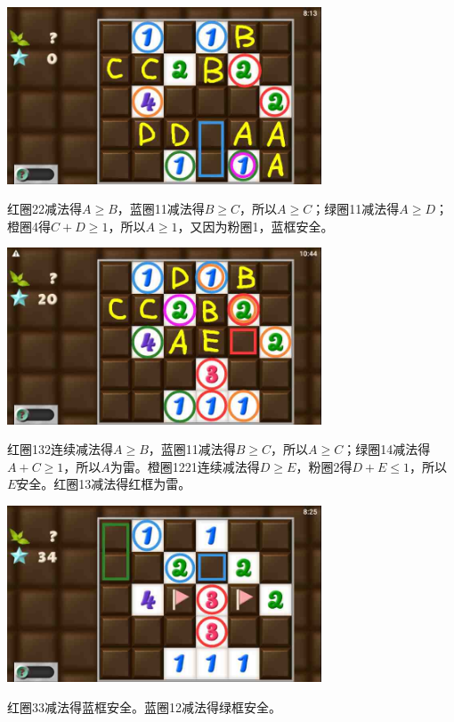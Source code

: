 \subsection{} %
\begin{center}
    \includegraphics[width=0.7\textwidth]{puzzlelow/221-1.jpg}
\end{center}
红圈22减法得$A\ge B$，蓝圈11减法得$B\ge C$，所以$A\ge C$；绿圈11减法得$A\ge D$；橙圈4得$C+D\ge 1$，所以$A\ge 1$，又因为粉圈1，蓝框安全。
\begin{center}
    \includegraphics[width=0.7\textwidth]{puzzlelow/221-2.jpg}
\end{center}
红圈132连续减法得$A\ge B$，蓝圈11减法得$B\ge C$，所以$A\ge C$；绿圈14减法得$A+C\ge 1$，所以$A$为雷。橙圈1221连续减法得$D\ge E$，粉圈2得$D+E\le 1$，所以$E$安全。红圈13减法得红框为雷。
\begin{center}
    \includegraphics[width=0.7\textwidth]{puzzlelow/221-3.jpg}
\end{center}
红圈33减法得蓝框安全。蓝圈12减法得绿框安全。
